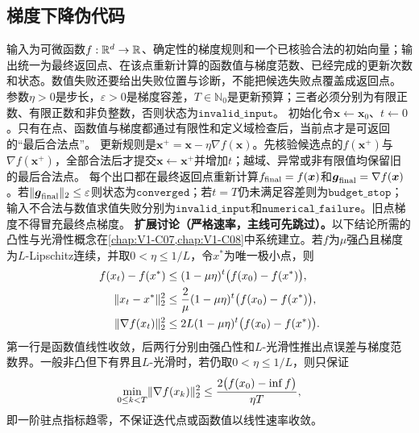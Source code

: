 \subsection*{梯度下降伪代码}
\label{schema:V1-C03:CH-19}
\label{schema:V1-C03:CH-20}
输入为可微函数$f:\mathbb{R}^d\to\mathbb{R}$、确定性的梯度规则和一个已核验合法的初始向量；输出统一为最终返回点、在该点重新计算的函数值与梯度范数、已经完成的更新次数和状态。数值失败还要给出失败位置与诊断，不能把候选失败点覆盖成返回点。
\label{schema:V1-C03:CH-21}
参数$\eta>0$是步长，$\varepsilon>0$是梯度容差，$T\in\mathbb N_0$是更新预算；三者必须分别为有限正数、有限正数和非负整数，否则状态为$\mathtt{invalid\_input}$。
\label{schema:V1-C03:CH-22}
初始化令$\boldsymbol{x}\leftarrow\boldsymbol{x}_0$、$t\leftarrow0$。只有在点、函数值与梯度都通过有限性和定义域检查后，当前点才是可返回的“最后合法点”。
\label{schema:V1-C03:CH-23}
更新规则是$\boldsymbol{x}^{+}=\boldsymbol{x}-\eta\nabla f(\boldsymbol{x})$。先核验候选点的$f(\boldsymbol{x}^{+})$与$\nabla f(\boldsymbol{x}^{+})$，全部合法后才提交$\boldsymbol{x}\leftarrow\boldsymbol{x}^{+}$并增加$t$；越域、异常或非有限值均保留旧的最后合法点。
\label{schema:V1-C03:CH-24}
每个出口都在最终返回点重新计算$f_{\rm final}=f(\boldsymbol{x})$和$\boldsymbol g_{\rm final}=\nabla f(\boldsymbol{x})$。若$\lVert\boldsymbol g_{\rm final}\rVert_2\le\varepsilon$则状态为$\mathtt{converged}$；若$t=T$仍未满足容差则为$\mathtt{budget\_stop}$；输入不合法与数值求值失败分别为$\mathtt{invalid\_input}$和$\mathtt{numerical\_failure}$。旧点梯度不得冒充最终点梯度。
\label{schema:V1-C03:CH-25}
\textbf{扩展讨论（严格速率，主线可先跳过）。}以下结论所需的凸性与光滑性概念在\cref{chap:V1-C07,chap:V1-C08}中系统建立。若$f$为$\mu$强凸且梯度为$L$-Lipschitz连续，并取$0<\eta\le1/L$，令$x^*$为唯一极小点，则
\[
\begin{aligned}
f(x_t)-f(x^*)&\le(1-\mu\eta)^t\bigl(f(x_0)-f(x^*)\bigr),\\
\lVert x_t-x^*\rVert_2^2&\le\frac{2}{\mu}(1-\mu\eta)^t\bigl(f(x_0)-f(x^*)\bigr),\\
\lVert\nabla f(x_t)\rVert_2^2&\le2L(1-\mu\eta)^t\bigl(f(x_0)-f(x^*)\bigr).
\end{aligned}
\]
第一行是函数值线性收敛，后两行分别由强凸性和$L$-光滑性推出点误差与梯度范数界。一般非凸但下有界且$L$-光滑时，若仍取$0<\eta\le1/L$，则只保证
\[
\min_{0\le k<T}\lVert\nabla f(x_k)\rVert_2^2
\le\frac{2\bigl(f(x_0)-\inf f\bigr)}{\eta T},
\]
即一阶驻点指标趋零，不保证迭代点或函数值以线性速率收敛。

